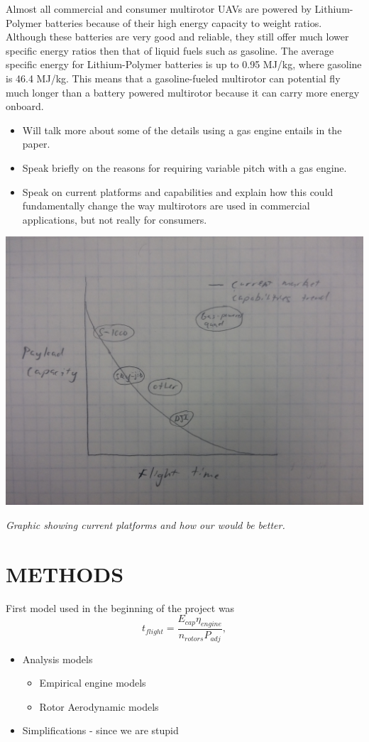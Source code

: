 \documentclass[letterpaper, 10 pt, conference]{ieeeconf}  %
\makeatletter
\newenvironment{figurehere}
  {\def\@captype{figure}}
  {}
\makeatother
\begin{document}
Almost all commercial and consumer multirotor UAVs are powered by Lithium-Polymer batteries because of their high energy capacity to weight ratios. Although these batteries are very good and reliable, they still offer much lower specific energy ratios then that of liquid fuels such as gasoline. The average specific energy for Lithium-Polymer batteries is up to 0.95 MJ/kg, where gasoline is 46.4 MJ/kg. This means that a gasoline-fueled multirotor can potential fly much longer than a battery powered multirotor because it can carry more energy onboard. 

\begin{itemize}
	\item{Will talk more about some of the details using a gas engine entails in the paper.}
	\item{Speak briefly on the reasons for requiring variable pitch with a gas engine.} 
	\item{Speak on current platforms and capabilities and explain how this could fundamentally change the way multirotors are used in commercial applications, but not really for consumers.}
\end{itemize}


\begin{figurehere}
	\begin{center}
		\includegraphics[width=.40\textwidth]{current_capabilities.jpg}
		\caption{\textit{Graphic showing current platforms and how our would be better.}}
		\label{current_cap}
	\end{center}
\end{figurehere}

	
\section{METHODS}

First model used in the beginning of the project was 
$$t_{flight} = \frac{E_{cap} \eta_{engine}}{n_{rotors}P_{adj}},$$

\begin{itemize}
	\item{Analysis models}
	\begin{itemize}
		\item{Empirical engine models}
		\item{Rotor Aerodynamic models}
	\end{itemize}
	\item{Simplifications - since we are stupid}
\end{itemize}
\end{document}
